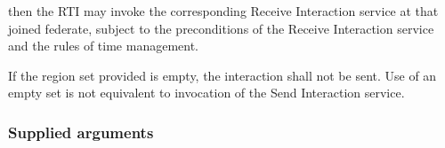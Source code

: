 \begin{compactstdpage}
    then the RTI may invoke the corresponding Receive Interaction \rtiinitiated{} service at that joined federate, subject to the preconditions of the Receive Interaction \rtiinitiated{} service and the rules of time management.

    If the region set provided is empty, the interaction shall not be sent. Use of an empty set is not equivalent to invocation of the Send Interaction service.

    \subsubsection{Supplied arguments}


\end{compactstdpage}

\clearpage

